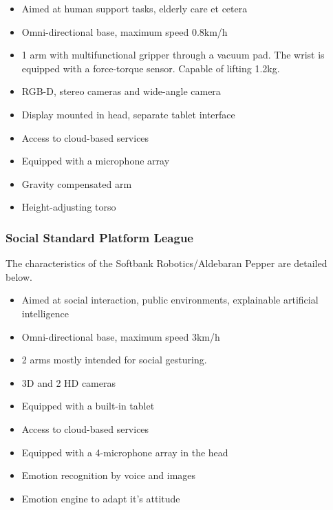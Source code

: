 \begin{itemize}
    \item Aimed at human support tasks, elderly care et cetera
    \item Omni-directional base, maximum speed 0.8km/h
    \item 1 arm with multifunctional gripper through a vacuum pad. The wrist is equipped with a force-torque sensor. Capable of lifting 1.2kg.
    \item RGB-D, stereo cameras and wide-angle camera
    \item Display mounted in head, separate tablet interface
    \item Access to cloud-based services
    \item Equipped with a microphone array
    \item Gravity compensated arm
    \item Height-adjusting torso
\end{itemize}

\subsubsection{Social Standard Platform League}
The characteristics of the Softbank Robotics/Aldebaran Pepper are detailed below.

\begin{itemize}
    \item Aimed at social interaction, public environments, explainable artificial intelligence
    \item Omni-directional base, maximum speed 3km/h
    \item 2 arms mostly intended for social gesturing.
    \item 3D and 2 HD cameras
    \item Equipped with a built-in tablet
    \item Access to cloud-based services
    \item Equipped with a 4-microphone array in the head
    \item Emotion recognition by voice and images
    \item Emotion engine to adapt it's attitude
\end{itemize}